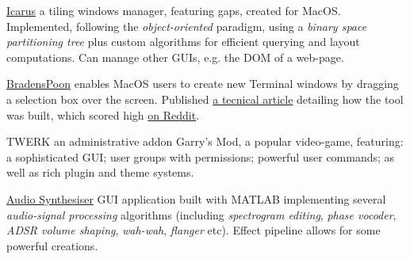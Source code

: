 
\begin{cvopensource}
  \cvproject
    {\href{https://github.com/Braden1996/Icarus}{Icarus}}
    {
      a tiling windows manager, featuring gaps, created for MacOS. Implemented, following the \textit{object-oriented} paradigm, using a \textit{binary space partitioning tree} plus custom algorithms for efficient querying and layout computations. Can manage other GUIs, e.g. the DOM of a web-page.
    }

  \cvproject
    {\href{https://github.com/Braden1996/BradensPoon}{BradensPoon}}
    {
      enables MacOS users to create new Terminal windows by dragging a selection box over the screen. Published \href{https://blog.theodo.fr/2018/03/making-runtime-funtime-hammerspoon/}{a tecnical article} detailing how the tool was built, which scored high \href{https://www.reddit.com/r/unixporn/comments/82opm5/ocmacos_drawing_iterm_windows/}{on Reddit}.
    }

  \cvproject
    {TWERK}
    {
      an administrative addon Garry's Mod, a popular video-game, featuring: a sophisticated GUI; user groups with permissions; powerful user commands; as well as rich plugin and theme systems.
    }

  \cvproject
    {\href{https://github.com/Braden1996/Audio-Synthesiser}{Audio Synthesiser}}
    {
      GUI application built with MATLAB implementing several \textit{audio-signal processing} algorithms (including \textit{spectrogram editing}, \textit{phase vocoder}, \textit{ADSR volume shaping}, \textit{wah-wah}, \textit{flanger} etc). Effect pipeline allows for some powerful creations.
    }
\end{cvopensource}
